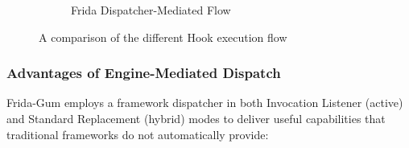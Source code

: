 \begin{figure}[H]
\begin{subfigure}{\textwidth}
		\caption{Frida Dispatcher-Mediated Flow}
		\label{fig:Frida}
	\end{subfigure}
	
	\caption{A comparison of the different Hook execution flow}
	\label{fig:instrumentation_comparison}
\end{figure}

\subsubsection{Advantages of Engine-Mediated Dispatch}
\label{subsubsec:advantages}

Frida-Gum employs a framework dispatcher in both Invocation Listener (active) and Standard Replacement (hybrid) modes to deliver useful capabilities that traditional frameworks do not automatically provide:

